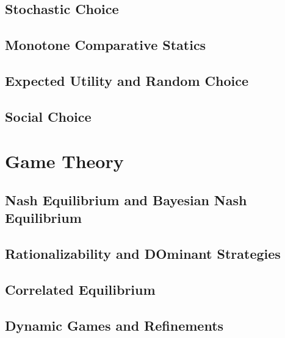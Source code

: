 \documentclass[12pt,openany]{report}
\theoremstyle{definition}
\begin{document}
\chapter{Stochastic Choice}

\chapter{Monotone Comparative Statics}

\chapter{Expected Utility and Random Choice}

\chapter{Social Choice}



\part{Game Theory}

\chapter{Nash Equilibrium and Bayesian Nash Equilibrium}

\chapter{Rationalizability and DOminant Strategies}

\chapter{Correlated Equilibrium}

\chapter{Dynamic Games and Refinements}
\end{document}
